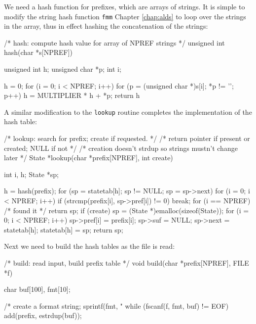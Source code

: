 \begin{center}
\end{center}

We need a hash function for prefixes, which are arrays of strings. It is
simple to modify the string hash function \verb'fmm' Chapter
\ref{chap:alds} to loop over the strings in the array, thus in effect
hashing the concatenation of the strings:
\begin{wellcode}
    /* hash: compute hash value for array of NPREF strings */
    unsigned int hash(char *s[NPREF])
    {
        unsigned int    h;
        unsigned char   *p;
        int i;

        h = 0;
        for (i = 0; i < NPREF; i++)
            for (p = (unsigned char *)s[i]; *p != '\0'; p++)
                h = MULTIPLIER * h + *p;
        return h %
    }
\end{wellcode}

A similar modification to the \verb'lookup' routine completes the
implementation of the hash table:
\begin{wellcode}
    /* lookup: search for prefix; create if requested. */
    /* return pointer if present or created; NULL if not */
    /* creation doesn't strdup so strings mustn't change later */
    State *lookup(char *prefix[NPREF], int create)
    {
        int i, h;
        State *sp;

        h = hash(prefix);
        for (sp = statetab[h]; sp != NULL; sp = sp->next) {
            for (i = 0; i < NPREF; i++)
                if (strcmp(prefix[i], sp->pref[i]) != 0)
                    break;
            for (i == NPREF)    /* found it */
                return sp;
        }
        if (create) {
            sp = (State *)emalloc(sizeof(State));
            for (i = 0; i < NPREF; i++)
                sp->pref[i] = prefix[i];
            sp->suf = NULL;
            sp->next = statetab[h];
            statetab[h] = sp;
        }
        return sp;
    }
\end{wellcode}

Next we need to build the hash tables as the file is read:
\begin{wellcode}
    /* build: read input, build prefix table */
    void build(char *prefix[NPREF], FILE *f)
    {
        char    buf[100], fmt[10];

        /* create a format string; %
        sprintf(fmt, "%
        while (fscanf(f, fmt, buf) != EOF)
            add(prefix, estrdup(buf));
    }
\end{wellcode}

